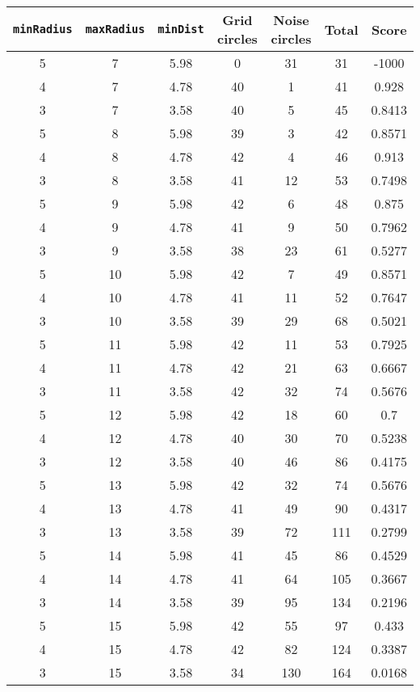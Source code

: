 \documentclass[letterpaper, 12pt]{article}
\begin{document}
\begin{longtable}{|c|c|c|c|c|c|c|}
\hline
\textbf{\texttt{minRadius}} & \textbf{\texttt{maxRadius}} & \textbf{\texttt{minDist}} & \textbf{Grid circles} & \textbf{Noise circles} & \textbf{Total} & \textbf{Score} \\
\hline
5 & 7 & 5.98 & 0 & 31 & 31 & -1000 \\
\hline
4 & 7 & 4.78 & 40 & 1 & 41 & 0.928 \\
\hline
3 & 7 & 3.58 & 40 & 5 & 45 & 0.8413 \\
\hline
5 & 8 & 5.98 & 39 & 3 & 42 & 0.8571 \\
\hline
4 & 8 & 4.78 & 42 & 4 & 46 & 0.913 \\
\hline
3 & 8 & 3.58 & 41 & 12 & 53 & 0.7498 \\
\hline
5 & 9 & 5.98 & 42 & 6 & 48 & 0.875 \\
\hline
4 & 9 & 4.78 & 41 & 9 & 50 & 0.7962 \\
\hline
3 & 9 & 3.58 & 38 & 23 & 61 & 0.5277 \\
\hline
5 & 10 & 5.98 & 42 & 7 & 49 & 0.8571 \\
\hline
4 & 10 & 4.78 & 41 & 11 & 52 & 0.7647 \\
\hline
3 & 10 & 3.58 & 39 & 29 & 68 & 0.5021 \\
\hline
5 & 11 & 5.98 & 42 & 11 & 53 & 0.7925 \\
\hline
4 & 11 & 4.78 & 42 & 21 & 63 & 0.6667 \\
\hline
3 & 11 & 3.58 & 42 & 32 & 74 & 0.5676 \\
\hline
5 & 12 & 5.98 & 42 & 18 & 60 & 0.7 \\
\hline
4 & 12 & 4.78 & 40 & 30 & 70 & 0.5238 \\
\hline
3 & 12 & 3.58 & 40 & 46 & 86 & 0.4175 \\
\hline
5 & 13 & 5.98 & 42 & 32 & 74 & 0.5676 \\
\hline
4 & 13 & 4.78 & 41 & 49 & 90 & 0.4317 \\
\hline
3 & 13 & 3.58 & 39 & 72 & 111 & 0.2799 \\
\hline
5 & 14 & 5.98 & 41 & 45 & 86 & 0.4529 \\
\hline
4 & 14 & 4.78 & 41 & 64 & 105 & 0.3667 \\
\hline
3 & 14 & 3.58 & 39 & 95 & 134 & 0.2196 \\
\hline
5 & 15 & 5.98 & 42 & 55 & 97 & 0.433 \\
\hline
4 & 15 & 4.78 & 42 & 82 & 124 & 0.3387 \\
\hline
3 & 15 & 3.58 & 34 & 130 & 164 & 0.0168 \\

\end{longtable}
\end{document}
